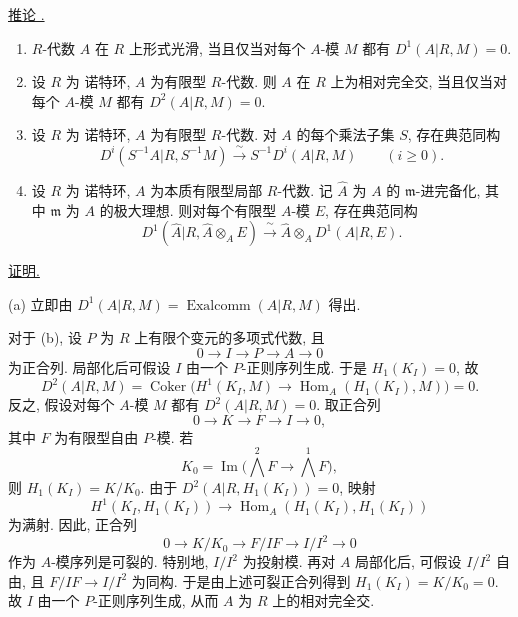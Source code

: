 

\underline{推论 .}

\begin{enumerate}[label=(\alph*)]
\item $R$-代数 $A$ 在 $R$ 上形式光滑, 当且仅当对每个 $A$-模 $M$ 都有 $D^1(A|R,M)=0$.

\item 设 $R$ 为 诺特环, $A$ 为有限型 $R$-代数. 则 $A$ 在 $R$ 上为相对完全交, 当且仅当对每个 $A$-模 $M$ 都有 $D^2(A|R,M)=0$.

\item 设 $R$ 为 诺特环, $A$ 为有限型 $R$-代数. 对 $A$ 的每个乘法子集 $S$, 存在典范同构
\[
 D^i(S^{-1}A|R,S^{-1}M)
 \xrightarrow{\ \sim\ }S^{-1}D^i(A|R,M)
 \qquad(i\geq0).
\]

\item 设 $R$ 为 诺特环, $A$ 为本质有限型局部 $R$-代数. 记 $\widehat A$ 为 $A$ 的 $\mathfrak m$-进完备化, 其中 $\mathfrak m$ 为 $A$ 的极大理想. 则对每个有限型 $A$-模 $E$, 存在典范同构
\[
 D^1(\widehat A|R,\widehat A\otimes_AE)
 \xrightarrow{\ \sim\ }
 \widehat A\otimes_AD^1(A|R,E).
\]
\end{enumerate}

\underline{证明.}

(a) 立即由 $D^1(A|R,M)=\operatorname{Exalcomm}(A|R,M)$ 得出.

对于 (b), 设 $P$ 为 $R$ 上有限个变元的多项式代数, 且
\[
 0\longrightarrow I\longrightarrow P\longrightarrow A
 \longrightarrow0
\]
为正合列. 局部化后可假设 $I$ 由一个 $P$-正则序列生成. 于是 $H_1(K_I)=0$, 故
\[
 D^2(A|R,M)
 =\operatorname{Coker}\bigl(
 H^1(K_I,M)\longrightarrow
 \operatorname{Hom}_A(H_1(K_I),M)\bigr)=0.
\]
反之, 假设对每个 $A$-模 $M$ 都有 $D^2(A|R,M)=0$. 取正合列
\[
 0\longrightarrow K\longrightarrow F\longrightarrow I
 \longrightarrow0,
\]
其中 $F$ 为有限型自由 $P$-模. 若
\[
 K_0=\operatorname{Im}\bigl(\textstyle\bigwedge^2F
 \longrightarrow\bigwedge^1F\bigr),
\]
则 $H_1(K_I)=K/K_0$. 由于 $D^2(A|R,H_1(K_I))=0$, 映射
\[
 H^1(K_I,H_1(K_I))
 \longrightarrow
 \operatorname{Hom}_A(H_1(K_I),H_1(K_I))
\]
为满射. 因此, 正合列
\[
 0\longrightarrow K/K_0\longrightarrow F/IF
 \longrightarrow I/I^2\longrightarrow0
\]
作为 $A$-模序列是可裂的. 特别地, $I/I^2$ 为投射模. 再对 $A$ 局部化后, 可假设 $I/I^2$ 自由, 且 $F/IF\longrightarrow I/I^2$ 为同构. 于是由上述可裂正合列得到 $H_1(K_I)=K/K_0=0$. 故 $I$ 由一个 $P$-正则序列生成, 从而 $A$ 为 $R$ 上的相对完全交.

